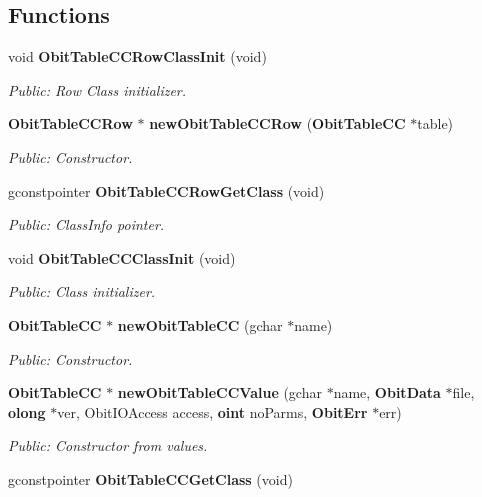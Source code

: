 \subsection*{Functions}
\begin{CompactItemize}
\item 
void {\bf Obit\-Table\-CCRow\-Class\-Init} (void)
\begin{CompactList}\small\item\em Public: Row Class initializer. \item\end{CompactList}\item 
{\bf Obit\-Table\-CCRow} $\ast$ {\bf new\-Obit\-Table\-CCRow} ({\bf Obit\-Table\-CC} $\ast$table)
\begin{CompactList}\small\item\em Public: Constructor. \item\end{CompactList}\item 
gconstpointer {\bf Obit\-Table\-CCRow\-Get\-Class} (void)
\begin{CompactList}\small\item\em Public: Class\-Info pointer. \item\end{CompactList}\item 
void {\bf Obit\-Table\-CCClass\-Init} (void)
\begin{CompactList}\small\item\em Public: Class initializer. \item\end{CompactList}\item 
{\bf Obit\-Table\-CC} $\ast$ {\bf new\-Obit\-Table\-CC} (gchar $\ast$name)
\begin{CompactList}\small\item\em Public: Constructor. \item\end{CompactList}\item 
{\bf Obit\-Table\-CC} $\ast$ {\bf new\-Obit\-Table\-CCValue} (gchar $\ast$name, {\bf Obit\-Data} $\ast$file, {\bf olong} $\ast$ver, Obit\-IOAccess access, {\bf oint} no\-Parms, {\bf Obit\-Err} $\ast$err)
\begin{CompactList}\small\item\em Public: Constructor from values. \item\end{CompactList}\item 
gconstpointer {\bf Obit\-Table\-CCGet\-Class} (void)

\end{CompactItemize}
